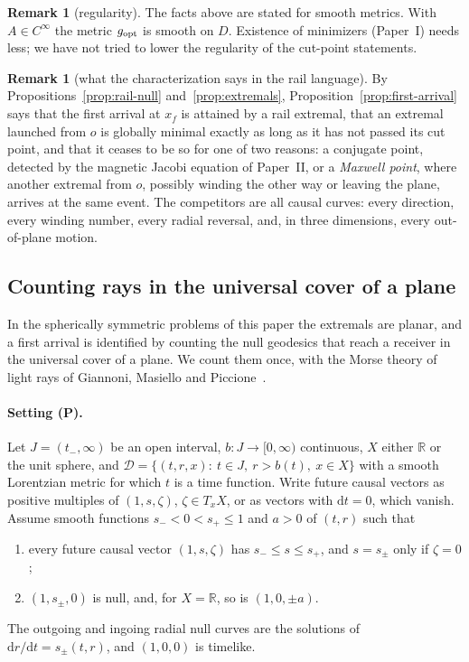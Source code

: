 \documentclass[aip,jmp,amsmath,amssymb,reprint]{revtex4-2}
\newcommand{\dd}{\mathrm{d}}
\newcommand{\gopt}{g_{\rm opt}}
\theoremstyle{plain}
\theoremstyle{definition}
\newtheorem{remark}[proposition]{Remark}
\begin{document}
\begin{remark}[regularity]
The facts above are stated for smooth metrics. With $A\in C^\infty$ the metric $\gopt$ is
smooth on $D$. Existence of minimizers (Paper~I) needs less; we have not tried to lower
the regularity of the cut-point statements.
\end{remark}

\begin{remark}[what the characterization says in the rail language]
By Propositions~\ref{prop:rail-null} and~\ref{prop:extremals},
Proposition~\ref{prop:first-arrival} says that the first arrival at $x_f$ is attained by
a rail extremal, that an extremal launched from $o$ is globally minimal exactly as long
as it has not passed its cut point, and that it ceases to be so for one of two reasons:
a conjugate point, detected by the magnetic Jacobi equation of Paper~II, or a
\emph{Maxwell point}, where another extremal from $o$, possibly winding the other way or
leaving the plane, arrives at the same event. The competitors are all causal curves:
every direction, every winding number, every radial reversal, and, in three dimensions,
every out-of-plane motion.
\end{remark}

\subsection{Counting rays in the universal cover of a plane}
\label{sec:count}
In the spherically symmetric problems of this paper the extremals are planar, and a first
arrival is identified by counting the null geodesics that reach a receiver in the universal
cover of a plane. We count them once, with the Morse theory of light rays of Giannoni,
Masiello and Piccione~\cite{GiannoniMasielloPiccioneMorse}.

\paragraph{Setting (P).} Let $J=(t_-,\infty)$ be an open interval, $b:J\to[0,\infty)$ continuous,
$X$ either $\mathbb R$ or the unit sphere, and
$\mathcal D=\{(t,r,x):\ t\in J,\ r>b(t),\ x\in X\}$ with a smooth Lorentzian metric for which
$t$ is a time function. Write future causal vectors as positive multiples of $(1,s,\zeta)$,
$\zeta\in T_xX$, or as vectors with $\dd t=0$, which vanish. Assume smooth functions
$s_-<0<s_+\le1$ and $a>0$ of $(t,r)$ such that
\begin{enumerate}
\item[(i)] every future causal vector $(1,s,\zeta)$ has $s_-\le s\le s_+$, and $s=s_\pm$ only if
  $\zeta=0$;
\item[(ii)] $(1,s_\pm,0)$ is null, and, for $X=\mathbb R$, so is $(1,0,\pm a)$.
\end{enumerate}
The outgoing and ingoing radial null curves are the solutions of $\dd r/\dd t=s_\pm(t,r)$, and
$(1,0,0)$ is timelike.
\end{document}
